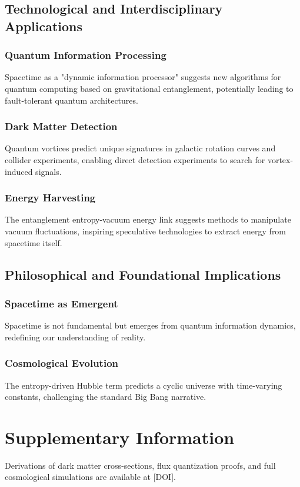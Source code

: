 \documentclass[12pt, a4paper]{article}
\begin{document}
\subsection{Technological and Interdisciplinary Applications}
\subsubsection{Quantum Information Processing}
Spacetime as a "dynamic information processor" suggests new algorithms for quantum computing based on gravitational entanglement, potentially leading to fault-tolerant quantum architectures.

\subsubsection{Dark Matter Detection}
Quantum vortices predict unique signatures in galactic rotation curves and collider experiments, enabling direct detection experiments to search for vortex-induced signals.

\subsubsection{Energy Harvesting}
The entanglement entropy-vacuum energy link suggests methods to manipulate vacuum fluctuations, inspiring speculative technologies to extract energy from spacetime itself.

\subsection{Philosophical and Foundational Implications}
\subsubsection{Spacetime as Emergent}
Spacetime is not fundamental but emerges from quantum information dynamics, redefining our understanding of reality.

\subsubsection{Cosmological Evolution}
The entropy-driven Hubble term predicts a cyclic universe with time-varying constants, challenging the standard Big Bang narrative.

\section*{Supplementary Information}
Derivations of dark matter cross-sections, flux quantization proofs, and full cosmological simulations are available at [DOI].
\end{document}
